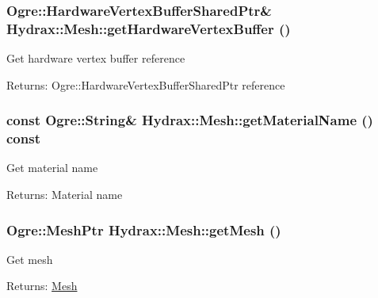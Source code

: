 \begin{CompactItemize}
{\subsubsection[{getHardwareVertexBuffer}]{\setlength{\rightskip}{0pt plus 5cm}Ogre::HardwareVertexBufferSharedPtr\& Hydrax::Mesh::getHardwareVertexBuffer ()}}
\label{class_hydrax_1_1_mesh_429bf7b9c15604e6a2e3a988b2473484}


Get hardware vertex buffer reference \begin{Desc}
\item[Returns:]Ogre::HardwareVertexBufferSharedPtr reference \end{Desc}
\hypertarget{class_hydrax_1_1_mesh_8445a8603832ae6e003ece91a46627c9}{
\subsubsection[{getMaterialName}]{\setlength{\rightskip}{0pt plus 5cm}const Ogre::String\& Hydrax::Mesh::getMaterialName () const}}
\label{class_hydrax_1_1_mesh_8445a8603832ae6e003ece91a46627c9}


Get material name \begin{Desc}
\item[Returns:]Material name \end{Desc}
\hypertarget{class_hydrax_1_1_mesh_a2cd7950048f839a3997299173b22bfb}{
\subsubsection[{getMesh}]{\setlength{\rightskip}{0pt plus 5cm}Ogre::MeshPtr Hydrax::Mesh::getMesh ()}}
\label{class_hydrax_1_1_mesh_a2cd7950048f839a3997299173b22bfb}


Get mesh \begin{Desc}
\item[Returns:]\hyperlink{class_hydrax_1_1_mesh}{Mesh} \end{Desc}
\hypertarget{class_hydrax_1_1_mesh_d3b37eaa18198d3f4690bf17877bd61f}{
}
\end{CompactItemize}
